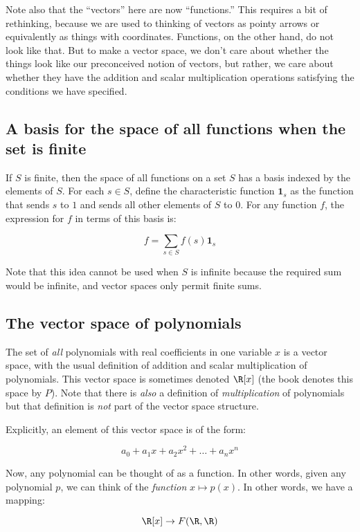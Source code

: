 \documentclass[10pt]{amsart}
\begin{document}
Note also that the ``vectors'' here are now ``functions.'' This
requires a bit of rethinking, because we are used to thinking of
vectors as pointy arrows or equivalently as things with
coordinates. Functions, on the other hand, do not look like that. But
to make a vector space, we don't care about whether the things look
like our preconceived notion of vectors, but rather, we care about
whether they have the addition and scalar multiplication operations
satisfying the conditions we have specified.

\subsection{A basis for the space of all functions when the set is finite}

If $S$ is finite, then the space of all functions on a set $S$ has a
basis indexed by the elements of $S$. For each $s \in S$, define the
characteristic function $\mathbf{1}_s$ as the function that sends $s$
to $1$ and sends all other elements of $S$ to $0$. For any function
$f$, the expression for $f$ in terms of this basis is:

$$f = \sum_{s \in S} f(s)\mathbf{1}_s$$

Note that this idea cannot be used when $S$ is infinite because the
required sum would be infinite, and vector spaces only permit finite
sums.

\subsection{The vector space of polynomials}

The set of {\em all} polynomials with real coefficients in one
variable $x$ is a vector space, with the usual definition of addition
and scalar multiplication of polynomials. This vector space is
sometimes denoted $\R[x]$ (the book denotes this space by $P$). Note
that there is {\em also} a definition of {\em multiplication} of
polynomials but that definition is {\em not} part of the vector space
structure.

Explicitly, an element of this vector space is of the form:

$$a_0 + a_1x + a_2x^2 + \dots + a_nx^n$$

Now, any polynomial can be thought of as a function. In other words,
given any polynomial $p$, we can think of the {\em function} $x
\mapsto p(x)$. In other words, we have a mapping:

$$\R[x] \to F(\R,\R)$$
\end{document}
